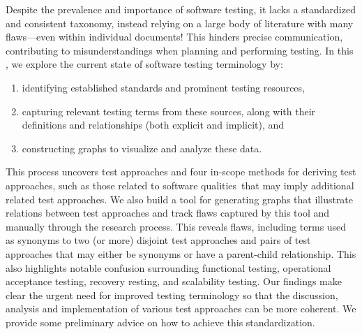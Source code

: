 Despite the prevalence and importance of software testing, it lacks
a standardized and consistent taxonomy, instead relying on a large body of
literature with many flaws---even within individual documents! This hinders
precise communication, contributing to misunderstandings when planning and
performing testing. In this \docType{}, we %
explore the current state of software testing terminology by:
\begin{enumerate}
    \item identifying established standards and prominent testing resources,
    \item capturing relevant testing terms from these sources, along with their
          definitions and relationships (both explicit and implicit), and
    \item constructing graphs to visualize and analyze these data.
\end{enumerate}
This process uncovers \approachCount{} test approaches and
\ifnotpaper four in-scope methods for deriving test approaches, such as those
    related to \fi \qualityCount{} software qualities\ifnotpaper\else\ that may
    imply additional related test approaches\fi. We also build
a tool for generating graphs that illustrate relations between test
approaches and track flaws captured by this tool and manually through
the research process. This reveals \flawCount{} flaws, including
\multiSynCount{} terms used as synonyms to two (or more) disjoint test approaches
and \parSynCount{} pairs of test approaches that may either be synonyms or have
a parent-child relationship. This also highlights notable confusion surrounding
functional testing, \ifnotpaper operational acceptance testing, \fi recovery
resting, and scalability testing. Our
findings make clear the urgent need for improved testing terminology so that
the discussion, analysis and implementation of various test approaches can be
more coherent. We provide some preliminary advice on how to achieve this
standardization.